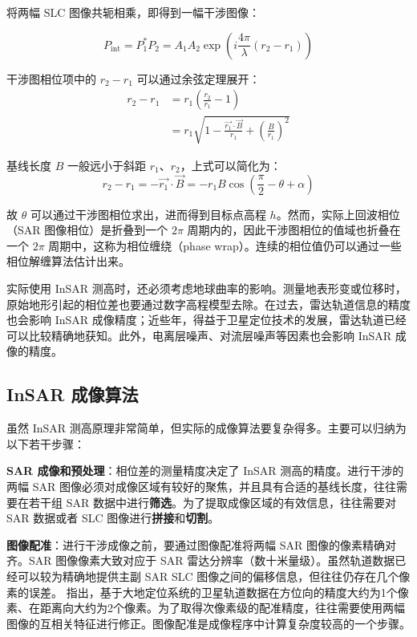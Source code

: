 将两幅 SLC 图像共轭相乘，即得到一幅干涉图像：

\begin{equation}
    P_{\textrm{int}} = P_1^* P_2 =  A_1 A_2 \exp(i \frac{4\pi}{\lambda}(r_2 - r_1))
\end{equation}

干涉图相位项中的 $ r_2 - r_1 $ 可以通过余弦定理展开：
\begin{equation}
\begin{split}
    r_2 - r_1 &= r_1 (\frac{r_2}{r_1} - 1) \\
              &= r_1 \sqrt{1- \frac{\vec{r_1} \cdot \vec{B}}{r_1} + (\frac{B}{r_1})^2}
\end{split}
\end{equation}

基线长度 $B$ 一般远小于斜距 $r_1$、$r_2$，上式可以简化为：
\begin{equation}
    r_2 - r_1 = - \vec{r_1} \cdot \vec{B} = - r_1 B \cos(\frac{\pi}{2} - \theta + \alpha)
\end{equation}

故 $\theta$ 可以通过干涉图相位求出，进而得到目标点高程 $h$。然而，实际上回波相位（SAR 图像相位）是折叠到一个 $2\pi$ 周期内的，因此干涉图相位的值域也折叠在一个 $2\pi$ 周期中，这称为相位缠绕（phase wrap）。连续的相位值仍可以通过一些相位解缠算法估计出来。

实际使用 InSAR 测高时，还必须考虑地球曲率的影响。测量地表形变或位移时，原始地形引起的相位差也要通过数字高程模型去除。在过去，雷达轨道信息的精度也会影响 InSAR 成像精度；近些年，得益于卫星定位技术的发展，雷达轨道已经可以比较精确地获知。此外，电离层噪声、对流层噪声等因素也会影响 InSAR 成像的精度。

\subsection{InSAR 成像算法}

虽然 InSAR 测高原理非常简单，但实际的成像算法要复杂得多。主要可以归纳为以下若干步骤：

\textbf{SAR 成像和预处理}：相位差的测量精度决定了 InSAR 测高的精度。进行干涉的两幅 SAR 图像必须对成像区域有较好的聚焦，并且具有合适的基线长度，往往需要在若干组 SAR 数据中进行\textbf{筛选}。为了提取成像区域的有效信息，往往需要对 SAR 数据或者 SLC 图像进行\textbf{拼接}和\textbf{切割}。

\textbf{图像配准}：进行干涉成像之前，要通过图像配准将两幅 SAR 图像的像素精确对齐。SAR 图像像素大致对应于 SAR 雷达分辨率（数十米量级\cite{sandwell2011gmtsar}）。虽然轨道数据已经可以较为精确地提供主副 SAR SLC 图像之间的偏移信息，但往往仍存在几个像素的误差。\citet{sandwell2011gmtsar} 指出，基于大地定位系统的卫星轨道数据在方位向的精度大约为1个像素、在距离向大约为2个像素。为了取得次像素级的配准精度，往往需要使用两幅图像的互相关特征进行修正。图像配准是成像程序中计算复杂度较高的一个步骤。

